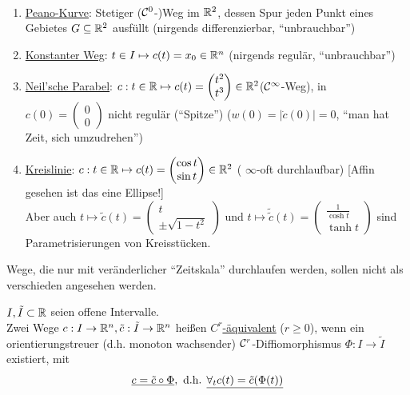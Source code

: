 \begin{bsp}\(\)
\begin{enumerate}
 \item \uline{Peano-Kurve}: Stetiger (\(\mathcal{C}^0\)-)Weg im \(\mathbb{R}^2\), dessen Spur jeden Punkt eines Gebietes \(G\subseteq \mathbb{R}^2\) ausfüllt (nirgends differenzierbar, "`unbrauchbar"')
 \item \uline{Konstanter Weg}: \(t \in I \mapsto c(t)=x_0 \in \mathbb{R}^n\) (nirgends regulär, "`unbrauchbar"')
 \item \uline{Neil'sche Parabel}: \(c: t\in \mathbb{R} \mapsto c(t) = \begin{pmatrix}
                                                                t^2 \\
								t^3
                                                               \end{pmatrix}
								\in \mathbb{R}^2 \)\quad (\(\mathcal{C}^\infty\)-Weg), in \(c(0)=\begin{pmatrix}
								                                                  0 \\
														  0
								                                                 \end{pmatrix} \) nicht regulär ("`Spitze"') (\(w(0)=|\dot c (0)|=0\), "`man hat Zeit, sich umzudrehen"')
 \item \uline{Kreislinie}: \(c: t\in \mathbb{R} \mapsto c(t)=\begin{pmatrix}
                                                       \cos t \\
						       \sin t
                                                      \end{pmatrix} \in \mathbb{R}^2\) ( \(\infty\)-oft durchlaufbar) [Affin gesehen ist das eine Ellipse!] \\
Aber auch \(t \mapsto \tilde c(t) = \begin{pmatrix}
                                     t \\
				     \pm \sqrt{1-t^2}
                                    \end{pmatrix} \) und \(t \mapsto \tilde{\tilde c}(t)=\begin{pmatrix}
											  \frac{1}{\cosh t} \\
											  \tanh t
											 \end{pmatrix} \)
sind Parametrisierungen von Kreisstücken.
\end{enumerate}
\end{bsp}
Wege,  die nur mit veränderlicher "`Zeitskala"' durchlaufen werden, sollen nicht als verschieden angesehen werden.
\begin{definition}
 \(I, \tilde I \subset \mathbb{R}\) seien offene Intervalle. \\
Zwei Wege \(c: I \to \mathbb{R}^n, \tilde c: \tilde I \to \mathbb{R}^n\) heißen \uline{\(C^r\)-äquivalent} (\(r\ge 0 \)), wenn ein orientierungstreuer (d.h. monoton wachsender) \(\mathcal{C}^r\)-Diffiomorphismus \(\Phi : I \to \tilde I\) existiert, mit
\[
 \uline{c= \tilde c \circ \Phi}, \text{ d.h. } \uline{\forall_t c(t)=\tilde c (\Phi(t))}
\]

\end{definition}

